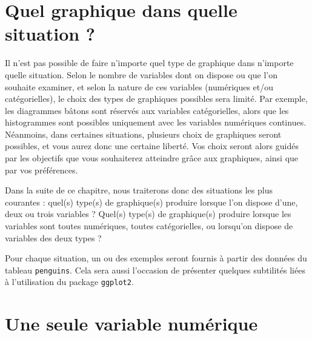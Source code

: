 \documentclass[
  a4paper,
  DIV=11,
  numbers=noendperiod,
  oneside]{scrreprt}
\begin{document}
\section{Quel graphique dans quelle situation
?}\label{quel-graphique-dans-quelle-situation}

Il n'est pas possible de faire n'importe quel type de graphique dans
n'importe quelle situation. Selon le nombre de variables dont on dispose
ou que l'on souhaite examiner, et selon la nature de ces variables
(numériques et/ou catégorielles), le choix des types de graphiques
possibles sera limité. Par exemple, les diagrammes bâtons sont réservés
aux variables catégorielles, alors que les histogrammes sont possibles
uniquement avec les variables numériques continues. Néanmoins, dans
certaines situations, plusieurs choix de graphiques seront possibles, et
vous aurez donc une certaine liberté. Vos choix seront alors guidés par
les objectifs que vous souhaiterez atteindre grâce aux graphiques, ainsi
que par vos préférences.

\begin{tcolorbox}[enhanced jigsaw, coltitle=black, toprule=.15mm, opacityback=0, breakable, colback=white, opacitybacktitle=0.6, colframe=quarto-callout-tip-color-frame, leftrule=.75mm, rightrule=.15mm, titlerule=0mm, bottomtitle=1mm, toptitle=1mm, arc=.35mm, title=\textcolor{quarto-callout-tip-color}{\faLightbulb}\hspace{0.5em}{Objectifs}, colbacktitle=quarto-callout-tip-color!10!white, bottomrule=.15mm, left=2mm]

Dans la suite de ce chapitre, nous traiterons donc des situations les
plus courantes : quel(s) type(s) de graphique(s) produire lorsque l'on
dispose d'une, deux ou trois variables ? Quel(s) type(s) de graphique(s)
produire lorsque les variables sont toutes numériques, toutes
catégorielles, ou lorsqu'on dispose de variables des deux types ?

Pour chaque situation, un ou des exemples seront fournis à partir des
données du tableau \texttt{penguins}. Cela sera aussi l'occasion de
présenter quelques subtilités liées à l'utilisation du package
\texttt{ggplot2}.

\end{tcolorbox}

\section{Une seule variable
numérique}\label{une-seule-variable-numuxe9rique}
\end{document}
